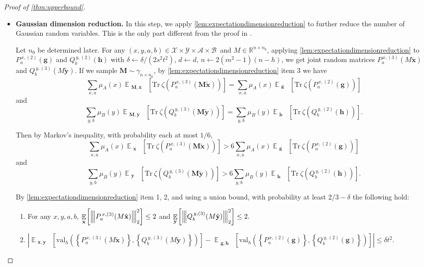 \documentclass[11pt]{article}
\theoremstyle{plain}
\theoremstyle{definition}
\newcommand {\minusspace} {\: \! \!}
\newcommand {\Fn} [2] {\ensuremath{ #1 \minusspace \Br{ #2 } }}
\newcommand{\reals}{{\mathbb R}}
\newcommand {\set} [1] {\ensuremath{ \left\lbrace #1 \right\rbrace }}
\newcommand {\br} [1] {\ensuremath{ \left( #1 \right) }}
\newcommand {\Br} [1] {\ensuremath{ \left[ #1 \right] }}
\newcommand {\ab} [1] {\ensuremath{ \left| #1 \right| }}
\DeclareMathOperator*{\bigE}{\mathbb{E}}
\newcommand {\expec} [2] {\Fn{\bigE_{\substack{#1}}}{#2}}
\newcommand{\nnorm}[1]{{\left\vert\kern-0.25ex\left\vert\kern-0.25ex\left\vert #1
		\right\vert\kern-0.25ex\right\vert\kern-0.25ex\right\vert}}
\newcommand {\Tr} {\ensuremath{ \mathrm{Tr} }}
\newcommand {\id} {\ensuremath{\mathds{1}}}
\newcommand{\randg}{\ensuremath{\mathbf{g}}}
\newcommand{\randh}{\ensuremath{\mathbf{h}}}
\newcommand{\randx}{\ensuremath{\mathbf{x}}}
\newcommand{\randy}{\ensuremath{\mathbf{y}}}
\newcommand{\randM}{\ensuremath{\mathbf{M}}}
\newcommand{\gval}[3]{\ensuremath{\mathrm{val}_{#1}\br{\set{#2},\set{#3}}}}
\newcommand{\fourtuples}{\ensuremath{\br{x,y,a,b}\in\calX\times\calY\times\calA\times\calB}}
\newcommand{\Pnn}[1] {\ensuremath{{P^{\,x, (#1)}_a}}}
\newcommand{\Qnn}[1] {\ensuremath{{Q^{\,y, (#1)}_b}}}
\newcommand{\calX}{\mathcal{X}}
\newcommand{\calY}{\mathcal{Y}}
\newcommand{\calA}{\mathcal{A}}
\newcommand{\calB}{\mathcal{B}}
\newcommand{\1}{\mathbb{1}} %
\begin{document}
\begin{proof}[Proof of \cref{thm:upperbound}]
\begin{itemize}
\begin{enumerate}
$\displaystyle\sum_{y,b}\mu_B(y)\ab{\frac{1}{m^h}\expec{}{\Tr~\zeta\br{{\Qnn{2}(\randh)}}}-\frac{1}{m^n}\Tr~\zeta\br{\Qnn{1}}}\leq O\br{t\br{3^dm^{d/2}\sqrt{\tau}d}^{2/3}}$.
\item For any $x,y$, $\sum_{a\in\calA}\Pnn{2}(\randg)=\sum_{b\in\calB}\Qnn{2}(\randh)=\id.$
	\end{enumerate}
	
\item \textbf{Gaussian dimension reduction.} 
In this step, we apply \cref{lem:expectationdimensionreduction} to further reduce the number of Gaussian random variables.
This is the only part different from the proof in \cite{qin2021nonlocal}.

	Let $n_0$ be determined later. 
	For any \fourtuples~and $M\in\reals^{n\times n_0}$, applying \cref{lem:expectationdimensionreduction} to $\Pnn{2}(\randg)$ and $\Qnn{2}(\randh)$ with $\delta\gets\delta/\br{2s^2t^2}$, $d\gets d$, $n\gets 2(m^2-1)(n-h)$, we get joint random matrices $\Pnn{3}(M\tilde{\randx})$ and $\Qnn{3}(M\tilde{\randy})$. If we sample $\randM\sim\gamma_{n\times n_0}$, by \cref{lem:expectationdimensionreduction} item 3 we have
\[\sum_{x,a}\mu_A(x)\expec{\randM,\randx}{\Tr~\zeta\br{\Pnn{3}(\randM\tilde{\randx})}}=\sum_{x,a}\mu_A(x)\expec{\randg}{\Tr~\zeta\br{\Pnn{2}(\randg)}}\]and\[\sum_{y,b}\mu_B(y)\expec{\randM,\randy}{\Tr~\zeta\br{\Qnn{3}(\randM\tilde{\randy})}}=\sum_{y,b}\mu_B(y)\expec{\randh}{\Tr~\zeta\br{\Qnn{2}(\randh)}}.\]

Then by Markov's inequality, with probability each at most $1/6$, 
\[\sum_{x,a}\mu_A(x)\expec{ \randx}{\Tr~\zeta\br{\Pnn{3}(\randM\tilde{\randx})}}>6\sum_{x,a}\mu_A(x)\expec{\randg}{\Tr~\zeta\br{\Pnn{2}(\randg)}}\]and\[\sum_{y,b}\mu_B(y)\expec{ \randy}{\Tr~\zeta\br{\Qnn{3}(\randM\tilde{\randy})}}>6\sum_{y,b}\mu_B(y)\expec{\randh}{\Tr~\zeta\br{\Qnn{2}(\randh)}}.\]

By \cref{lem:expectationdimensionreduction} item 1, 2, and using a union bound, with probability at least $2/3-\delta$ the following hold:

\begin{enumerate}
\item For any $x,y,a,b$, $\displaystyle\expec{ \randx}{\nnorm{\Pnn{3}(M\tilde{\randx})}_2^2}\leq2$ and
$\displaystyle\expec{ \randy}{\nnorm{\Qnn{3}(M\tilde{\randy})}_2^2}\leq2.$

\item $\displaystyle\ab{\expec{\randx,\randy}{\gval{h}{\Pnn{3}(M\tilde{\randx})}{\Qnn{3}(M\tilde{\randy})}}-\expec{\randg,\randh}{\gval{h}{\Pnn{2}(\randg)}{\Qnn{2}(\randg)}}}\leq\delta t^2.$


\end{enumerate}
\end{itemize}
\end{proof}
\end{document}
